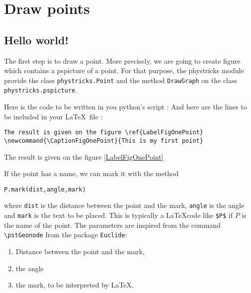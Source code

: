 \section{Draw points}

\subsection{Hello world!}


The first step is to draw a point. More precisely, we are going to create figure which contains a pspicture of a point. For that purpose, the phystricks module provide the class \verb+phystricks.Point+ and the method \verb+DrawGraph+ on the class \verb+phystricks.pspicture+. 

Here is the code to be written in you python's script :
And here are the lines to be included in your \LaTeX\ file :
\begin{verbatim}
The result is given on the figure \ref{LabelFigOnePoint}
\newcommand{\CaptionFigOnePoint}{This is my first point}

\end{verbatim}
The result is given on the figure \ref{LabelFigOnePoint}
\newcommand{\CaptionFigOnePoint}{This is my first point}


If the point has a name, we can mark it with the method
\begin{verbatim}
P.mark(dist,angle,mark)
\end{verbatim}
where \verb+dist+ is the distance between the point and the mark, \verb+angle+ is the angle and \verb+mark+ is the text to be placed. This is typically a \LaTeX code like \verb+$P$+ if $P$ is the name of the point. The parameters are inspired from the command \verb+\pstGeonode+ from the package \verb+Euclide+:
\begin{enumerate}

	\item
		Distance between the point and the mark,
	\item
		the angle
	\item
		the mark, to be interpreted by \LaTeX.

\end{enumerate}

